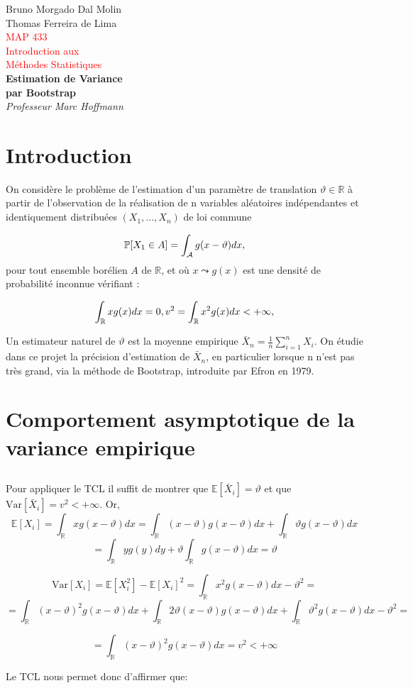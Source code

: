 \documentclass{article}
\newcommand{\mean}{\mathbb{E}}
\newcommand{\var}{\mathrm{Var}}
\newcommand{\R}{\mathbb{R}}
\newcommand*{\plogo}{\fbox{$\mathcal{PL}$}} %
\newcommand*{\titleTH}{\begingroup %
\raggedleft %
\vspace*{\baselineskip} %

{\Large Bruno Morgado Dal Molin \\ Thomas Ferreira de Lima}\\[0.167\textheight] %

{\textcolor{Red}{\huge MAP 433 \\Introduction aux \\ Méthodes Statistiques}}\\[\baselineskip] %

{\LARGE\bfseries Estimation de Variance \\par Bootstrap}\\[\baselineskip] %

{\Large \textit{Professeur Marc Hoffmann}}\par %

\vfill %
\vspace{2in}

\vspace*{3\baselineskip} %
\endgroup}
\begin{document}
\pagestyle{empty} %

\titleTH %


\section {Introduction}
	On considère le problème de l'estimation d'un paramètre de translation $\displaystyle \vartheta\in\R$
à partir de l'observation de la réalisation de n variables aléatoires indépendantes et identiquement distribuées
$\displaystyle (X_1,...,X_n)$ de loi commune

$$ \mathbb{P}[X_1\in A]= \int_{\cal A} g(x-\vartheta)dx,$$
pour tout ensemble borélien $\displaystyle A $ de $\displaystyle \R$, et où $\displaystyle x \leadsto g(x)$ est une densité de   probabilité inconnue vérifiant :

$$ \int_{\cal \R} xg(x)dx =0 , v^2 = \int_{\cal \R} x^2g(x)dx < +\infty,$$

Un estimateur naturel de $\displaystyle \vartheta$ est la moyenne empirique $\displaystyle \bar X_n = \frac{1}{n} \sum_{i=1}^n X_i$. On étudie dans ce projet la précision
d'estimation de $\displaystyle \bar X_n$, en particulier lorsque n n'est pas très grand, via la méthode de Bootstrap, introduite par Efron en 1979.
\section {Comportement asymptotique de la variance empirique}
\subsection{}
Pour appliquer le TCL il suffit de montrer que $\mean[\bar{X}_i] = \vartheta$ et que $\var[\bar{X}_i] = v^2 < +\infty $. Or,
$$\mean [X_i] = \int_{\R}xg(x-\vartheta)dx=\int_{\R}(x-\vartheta)g(x-\vartheta)dx+\int_{\R}\vartheta g(x-\vartheta)dx$$
$$=\int_{\R}y g(y)dy+\vartheta\int_{\R}g(x-\vartheta)dx= \vartheta$$

$$\var[X_i] = \mean[X_i^2] - \mean[X_i]^2 = \int_{\R}x^2g(x-\vartheta)dx - \vartheta^2 = $$
$$ = \int_{\R}(x-\vartheta)^2g(x-\vartheta)dx + \int_{\R}2\vartheta(x-\vartheta)g(x-\vartheta)dx + \int_{\R}\vartheta^2 g(x-\vartheta)dx - \vartheta^2 = $$

$$= \int_{\R}(x-\vartheta)^2g(x-\vartheta)dx = v^2 < + \infty$$

Le TCL nous permet donc d'affirmer que:
\end{document}
